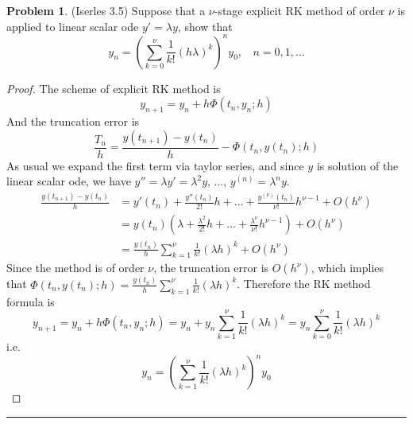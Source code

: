 \documentclass[a4paper, 10pt]{article}
\theoremstyle{definition}
\newtheorem{problem}{Problem}
\theoremstyle{hSol}
\begin{document}
\begin{problem} (Iserles 3.5) Suppose that a $\nu$-stage explicit RK method of order $\nu$ is applied to linear scalar ode $y' = \lambda y$, show that
$$
y_n = \left(\sum_{k=0}^{\nu} \frac{1}{k!} (h \lambda)^k\right)^n y_0,~~~~n=0,1,...
$$
\end{problem}
\begin{proof} The scheme of explicit RK method is
$$
y_{n+1} = y_n + h\Phi(t_n, y_n; h)
$$
And the truncation error is 
$$
\frac{T_n}{h} = \frac{y(t_{n+1})-y(t_n)}{h} - \Phi(t_n, y(t_n); h)
$$
As usual we expand the first term via taylor series, and since $y$ is solution of the linear scalar ode, we have $y'' = \lambda y' = \lambda^2 y$, ..., $y^{(n)}=\lambda^n y$.
\begin{equation}
  \begin{split}
    \frac{y(t_{n+1})-y(t_n)}{h} &= y'(t_n) + \frac{y''(t_n)}{2!}h + ... + \frac{y^{(\nu)}(t_n)}{\nu!}h^{\nu-1} + O(h^{\nu}) \\
    &= y(t_n)\left(\lambda  + \frac{\lambda^2}{2!}h + ... + \frac{\lambda^{\nu}}{\nu!}h^{\nu-1}\right) + O(h^{\nu})\\
    &= \frac{y(t_n)}{h}\sum_{k=1}^{\nu} \frac{1}{k!}(\lambda h)^k + O(h^{\nu})
  \end{split}
\end{equation}
Since the method is of order $\nu$, the truncation error is $O(h^{\nu})$, which implies that $\Phi(t_n, y(t_n); h) = \frac{y(t_n)}{h}\sum_{k=1}^{\nu} \frac{1}{k!}(\lambda h)^k$. Therefore the RK method formula is 
$$
y_{n+1}= y_n + h\Phi(t_n, y_n; h) = y_n + y_n\sum_{k=1}^{\nu} \frac{1}{k!}(\lambda h)^k = y_n\sum_{k=0}^{\nu} \frac{1}{k!}(\lambda h)^k
$$
i.e.
$$
y_n = \left(\sum_{k=1}^{\nu} \frac{1}{k!}(\lambda h)^k\right)^ny_0
$$
\end{proof} 
\noindent\rule{16cm}{0.4pt}
\end{document}
